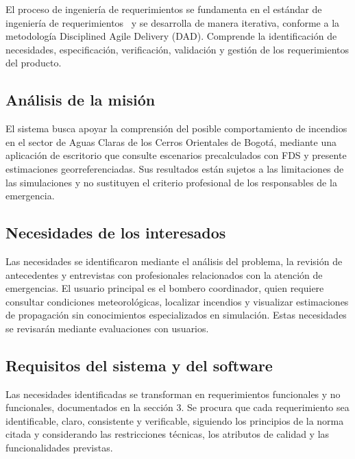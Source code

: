 
\label{sec:srs-4}

El proceso de ingeniería de requerimientos se fundamenta en el estándar de ingeniería de requerimientos~\cite{iso29148_2018} y se desarrolla de manera iterativa, conforme a la metodología Disciplined Agile Delivery (DAD). Comprende la identificación de necesidades, especificación, verificación, validación y gestión de los requerimientos del producto.

\subsection{Análisis de la misión}
\label{sec:srs-4-1}

El sistema busca apoyar la comprensión del posible comportamiento de incendios en el sector de Aguas Claras de los Cerros Orientales de Bogotá, mediante una aplicación de escritorio que consulte escenarios precalculados con FDS y presente estimaciones georreferenciadas. Sus resultados están sujetos a las limitaciones de las simulaciones y no sustituyen el criterio profesional de los responsables de la emergencia.

\subsection{Necesidades de los interesados}
\label{sec:srs-4-2}

Las necesidades se identificaron mediante el análisis del problema, la revisión de antecedentes y entrevistas con profesionales relacionados con la atención de emergencias. El usuario principal es el bombero coordinador, quien requiere consultar condiciones meteorológicas, localizar incendios y visualizar estimaciones de propagación sin conocimientos especializados en simulación. Estas necesidades se revisarán mediante evaluaciones con usuarios.

\subsection{Requisitos del sistema y del software}
\label{sec:srs-4-3}

Las necesidades identificadas se transforman en requerimientos funcionales y no funcionales, documentados en la sección 3. Se procura que cada requerimiento sea identificable, claro, consistente y verificable, siguiendo los principios de la norma citada y considerando las restricciones técnicas, los atributos de calidad y las funcionalidades previstas.

